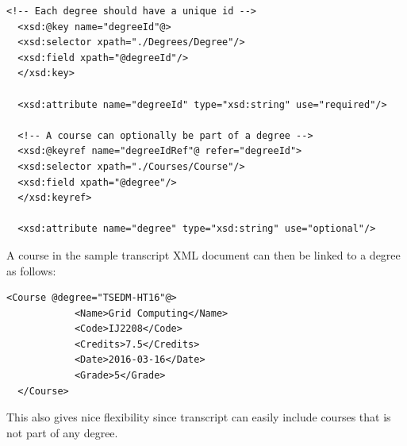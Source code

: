 \documentclass[a4paper, 11pt]{article}
\begin{document}
\lstset{language=XML}
\begin{lstlisting}[frame=single,style=base]
  <!-- Each degree should have a unique id -->
  <xsd:@key name="degreeId"@>
  <xsd:selector xpath="./Degrees/Degree"/>
  <xsd:field xpath="@degreeId"/>
  </xsd:key>

  <xsd:attribute name="degreeId" type="xsd:string" use="required"/>

  <!-- A course can optionally be part of a degree -->
  <xsd:@keyref name="degreeIdRef"@ refer="degreeId">
  <xsd:selector xpath="./Courses/Course"/>
  <xsd:field xpath="@degree"/>
  </xsd:keyref>

  <xsd:attribute name="degree" type="xsd:string" use="optional"/>
\end{lstlisting}
A course in the sample transcript XML document can then be linked to a degree as follows:
\begin{lstlisting}[frame=single,style=base]
  <Course @degree="TSEDM-HT16"@>
            <Name>Grid Computing</Name>
            <Code>IJ2208</Code>
            <Credits>7.5</Credits>
            <Date>2016-03-16</Date>
            <Grade>5</Grade>
  </Course>
\end{lstlisting}
This also gives nice flexibility since transcript can easily include courses that is not part of any degree.
\end{document}
